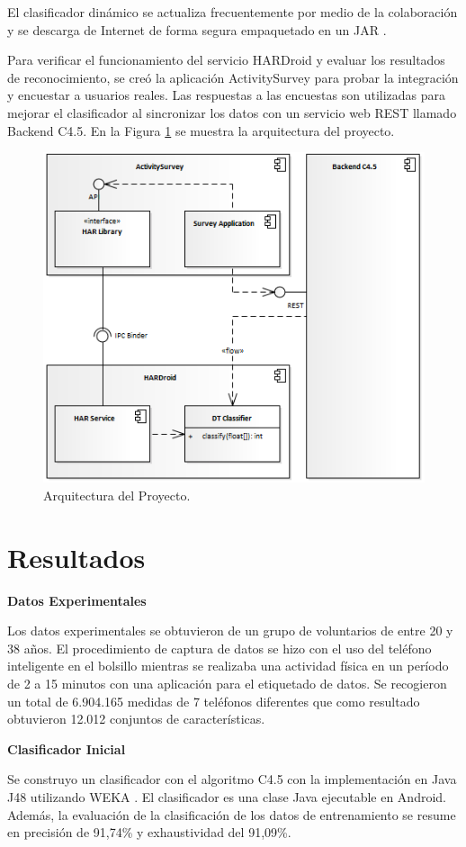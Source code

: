 \documentclass{sciposter}
\begin{document}
\begin{multicols}{3}
El clasificador dinámico se actualiza frecuentemente por medio de la colaboración y se descarga de Internet de forma segura empaquetado en un JAR \cite{Falsina2014}.

Para verificar el funcionamiento del servicio HARDroid y evaluar los resultados de reconocimiento, se creó la aplicación ActivitySurvey para probar la integración y encuestar a usuarios reales. Las respuestas a las encuestas son utilizadas para mejorar el clasificador al sincronizar los datos con un servicio web REST llamado Backend C4.5. En la Figura \ref{fig:arq-hardroid} se muestra la arquitectura del proyecto.

\begin{figure}
	\centering
	\includegraphics[width=0.7\linewidth]{../capitulo-5/graphics/arqui_general}
	\caption{Arquitectura del Proyecto.}
	\label{fig:arq-hardroid}
\end{figure}

\section{Resultados}

\textbf{Datos Experimentales}

Los datos experimentales se obtuvieron de un grupo de voluntarios de entre 20 y 38 años. El procedimiento de captura de datos se hizo con el uso del teléfono inteligente en el bolsillo mientras se realizaba una actividad física en un período de 2 a 15 minutos con una aplicación para el etiquetado de datos. Se recogieron un total de 6.904.165 medidas de 7 teléfonos diferentes que como resultado obtuvieron 12.012 conjuntos de características.

\textbf{Clasificador Inicial}

Se construyo un clasificador con el algoritmo C4.5 con la implementación en Java J48 utilizando WEKA \cite{Frank2016b}. El clasificador es una clase Java ejecutable en Android. Además, la evaluación de la clasificación de los datos de entrenamiento se resume en precisión de 91,74\% y exhaustividad del 91,09\%.


\end{multicols}
\end{document}
